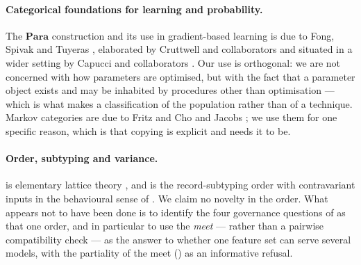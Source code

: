 \documentclass[11pt,a4paper]{article}
\renewcommand{\_}{\oldunderscore\allowbreak}
\theoremstyle{plain}
\theoremstyle{definition}
\theoremstyle{definition}
\theoremstyle{remark}
\newcommand{\Para}{\mathbf{Para}}
\begin{document}
\paragraph{Categorical foundations for learning and probability.} The $\Para$ construction and its use in
gradient-based learning is due to Fong, Spivak and Tuyeras \cite{fst2019}, elaborated by Cruttwell and
collaborators \cite{cruttwell2022} and situated in a wider setting by Capucci and collaborators
\cite{capucci2021}. Our use is orthogonal: we are not concerned with how parameters are optimised, but with
the fact that a parameter object exists and may be inhabited by procedures other than optimisation --- which
is what makes  a classification of the population rather than of a technique.
Markov categories are due to Fritz \cite{fritz2020} and Cho and Jacobs \cite{chojacobs2019}; we use them for
one specific reason, which is that copying is explicit and  needs it to be.

\paragraph{Order, subtyping and variance.}  is elementary lattice theory
\cite{davey2002,birkhoff1967}, and  is the record-subtyping order with contravariant
inputs \cite{cardelli1985} in the behavioural sense of \cite{liskov1994}. We claim no novelty in the order.
What appears not to have been done is to identify the four governance questions of  as
that one order, and in particular to use the \emph{meet} --- rather than a pairwise compatibility check ---
as the answer to whether one feature set can serve several models, with the partiality of the meet
() as an informative refusal.
\end{document}
